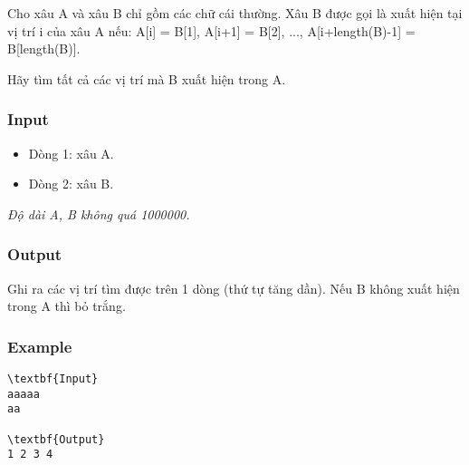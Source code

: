 

Cho xâu A và xâu B chỉ gồm các chữ cái thường. Xâu B được gọi là xuất hiện tại vị trí i của xâu A nếu: A[i] = B[1], A[i+1] = B[2], ..., A[i+length(B)-1] = B[length(B)].

Hãy tìm tất cả các vị trí mà B xuất hiện trong A.

\subsubsection{Input}
\begin{itemize}
	\item Dòng 1: xâu A.
	\item Dòng 2: xâu B.
\end{itemize}

\emph{Độ dài A, B không quá 1000000. }

\subsubsection{Output}

Ghi ra các vị trí tìm được trên 1 dòng (thứ tự tăng dần). Nếu B không xuất hiện trong A thì bỏ trắng.

\subsubsection{Example}
\begin{verbatim}
\textbf{Input}
aaaaa
aa

\textbf{Output}
1 2 3 4
\end{verbatim}